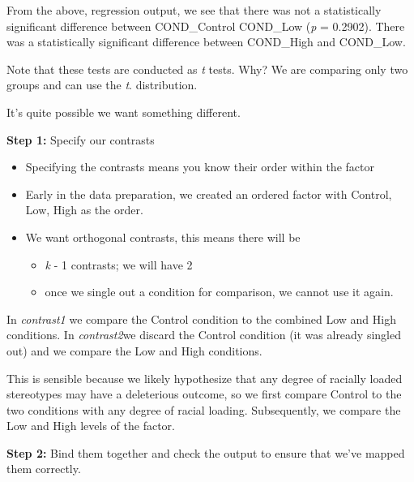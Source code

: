 \documentclass[
  english,
]{book}
\newenvironment{Shaded}{\begin{snugshade}}{\end{snugshade}}
\newcommand{\CommentTok}[1]{\textcolor[rgb]{0.56,0.35,0.01}{\textit{#1}}}
\newcommand{\DecValTok}[1]{\textcolor[rgb]{0.00,0.00,0.81}{#1}}
\newcommand{\KeywordTok}[1]{\textcolor[rgb]{0.13,0.29,0.53}{\textbf{#1}}}
\newcommand{\NormalTok}[1]{#1}
\newcommand{\OperatorTok}[1]{\textcolor[rgb]{0.81,0.36,0.00}{\textbf{#1}}}
\newcommand{\StringTok}[1]{\textcolor[rgb]{0.31,0.60,0.02}{#1}}
\providecommand{\tightlist}{%
  \setlength{\itemsep}{0pt}\setlength{\parskip}{0pt}}
\begin{document}
From the above, regression output, we see that there was not a statistically significant difference between COND\_Control COND\_Low (\emph{p} = 0.2902). There was a statistically significant difference between COND\_High and COND\_Low.

Note that these tests are conducted as \emph{t} tests. Why? We are comparing only two groups and can use the \emph{t}. distribution.

It's quite possible we want something different.

\textbf{Step 1: } Specify our contrasts

\begin{itemize}
\tightlist
\item
  Specifying the contrasts means you know their order within the factor
\item
  Early in the data preparation, we created an ordered factor with Control, Low, High as the order.
\item
  We want orthogonal contrasts, this means there will be

  \begin{itemize}
  \tightlist
  \item
    \emph{k} - 1 contrasts; we will have 2
  \item
    once we single out a condition for comparison, we cannot use it again.
  \end{itemize}
\end{itemize}

In \emph{contrast1} we compare the Control condition to the combined Low and High conditions.
In \emph{contrast2}we discard the Control condition (it was already singled out) and we compare the Low and High conditions.

This is sensible because we likely hypothesize that any degree of racially loaded stereotypes may have a deleterious outcome, so we first compare Control to the two conditions with any degree of racial loading. Subsequently, we compare the Low and High levels of the factor.

\textbf{Step 2:} Bind them together and check the output to ensure that we've mapped them correctly.

\begin{Shaded}
\end{Shaded}
\end{document}
